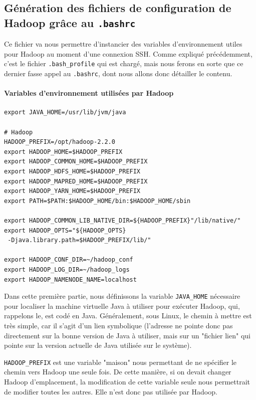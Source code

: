 \newpage

\subsection{Génération des fichiers de configuration de Hadoop grâce au \texttt{.bashrc}}
\label{sec:creat-des-fich}

\par Ce fichier va nous permettre d'instancier des variables d'environnement utiles pour Hadoop au moment d'une connexion SSH. Comme expliqué précédemment, c'est le fichier \texttt{.bash\_profile} qui est chargé, mais nous ferons en sorte que ce dernier fasse appel au \texttt{.bashrc}, dont nous allons donc détailler le contenu.

\paragraph{Variables d'environnement utilisées par Hadoop}
\label{sec:vari-denv-util}

\begin{verbatim}
export JAVA_HOME=/usr/lib/jvm/java

# Hadoop
HADOOP_PREFIX=/opt/hadoop-2.2.0
export HADOOP_HOME=$HADOOP_PREFIX
export HADOOP_COMMON_HOME=$HADOOP_PREFIX
export HADOOP_HDFS_HOME=$HADOOP_PREFIX
export HADOOP_MAPRED_HOME=$HADOOP_PREFIX
export HADOOP_YARN_HOME=$HADOOP_PREFIX
export PATH=$PATH:$HADOOP_HOME/bin:$HADOOP_HOME/sbin

export HADOOP_COMMON_LIB_NATIVE_DIR=${HADOOP_PREFIX}"/lib/native/"
export HADOOP_OPTS="${HADOOP_OPTS}
 -Djava.library.path=$HADOOP_PREFIX/lib/"

export HADOOP_CONF_DIR=~/hadoop_conf
export HADOOP_LOG_DIR=~/hadoop_logs
export HADOOP_NAMENODE_NAME=localhost
\end{verbatim}

\par Dans cette première partie, nous définissons la variable \texttt{JAVA\_HOME} nécessaire pour localiser la machine virtuelle Java à utiliser pour exécuter Hadoop, qui, rappelons le, est codé en Java. Généralement, sous Linux, le chemin à mettre est très simple, car il s'agit d'un lien symbolique (l'adresse ne pointe donc pas directement sur la bonne version de Java à utiliser, mais sur un "fichier lien" qui pointe sur la version actuelle de Java utilisée sur le système).

\par \texttt{HADOOP\_PREFIX} est une variable "maison" nous permettant de ne spécifier le chemin vers Hadoop une seule fois. De cette manière, si on devait changer Hadoop d'emplacement, la modification de cette variable seule nous permettrait de modifier toutes les autres. Elle n'est donc pas utilisée par Hadoop.

